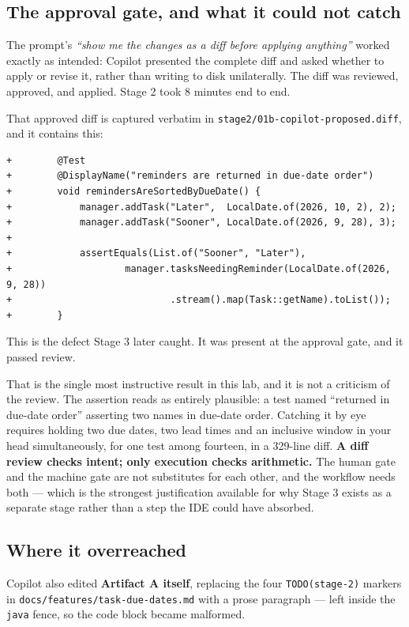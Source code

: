 \documentclass[11pt,a4paper]{article}
\newcommand{\code}[1]{\texttt{\small #1}}
\begin{document}
\subsection{The approval gate, and what it could not catch}
\label{sec:gate}

The prompt's \emph{``show me the changes as a diff before applying anything''}
worked exactly as intended: Copilot presented the complete diff and asked
whether to apply or revise it, rather than writing to disk unilaterally. The
diff was reviewed, approved, and applied. Stage 2 took 8 minutes end to end.

That approved diff is captured verbatim in
\code{stage2/01b-copilot-proposed.diff}, and it contains this:

\begin{lstlisting}[style=java]
+        @Test
+        @DisplayName("reminders are returned in due-date order")
+        void remindersAreSortedByDueDate() {
+            manager.addTask("Later",  LocalDate.of(2026, 10, 2), 2);
+            manager.addTask("Sooner", LocalDate.of(2026, 9, 28), 3);
+
+            assertEquals(List.of("Sooner", "Later"),
+                    manager.tasksNeedingReminder(LocalDate.of(2026, 9, 28))
+                            .stream().map(Task::getName).toList());
+        }
\end{lstlisting}

\noindent This is the defect Stage 3 later caught. It was present at the
approval gate, and it passed review.

That is the single most instructive result in this lab, and it is not a
criticism of the review. The assertion reads as entirely plausible: a test
named ``returned in due-date order'' asserting two names in due-date order.
Catching it by eye requires holding two due dates, two lead times and an
inclusive window in your head simultaneously, for one test among fourteen, in a
329-line diff. \textbf{A diff review checks intent; only execution checks
arithmetic.} The human gate and the machine gate are not substitutes for each
other, and the workflow needs both --- which is the strongest justification
available for why Stage 3 exists as a separate stage rather than a step the IDE
could have absorbed.

\subsection{Where it overreached}

Copilot also edited \textbf{Artifact A itself}, replacing the four
\code{TODO(stage-2)} markers in \code{docs/features/task-due-dates.md} with a
prose paragraph --- left inside the \code{java} fence, so the code block became
malformed.
\end{document}
